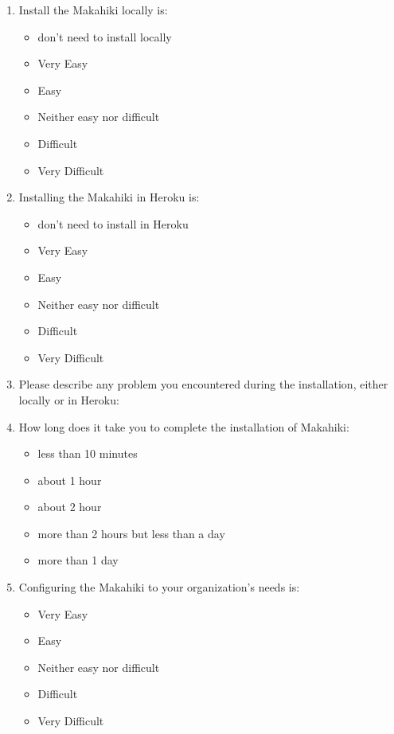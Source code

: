 \documentclass[11pt]{article}
\begin{document}
\begin{enumerate}

\item Install the Makahiki locally is: 
\begin{itemize}
\item don't need to install locally
\item Very Easy
\item Easy
\item Neither easy nor difficult
\item Difficult
\item Very Difficult
\end{itemize}

\item Installing the Makahiki in Heroku is: 
\begin{itemize}
\item don't need to install in Heroku
\item Very Easy
\item Easy
\item Neither easy nor difficult
\item Difficult
\item Very Difficult
\end{itemize}

\item Please describe any problem you encountered during the installation, either locally or in Heroku:

\item How long does it take you to complete the installation of Makahiki: 
\begin{itemize}
\item less than 10 minutes
\item about 1 hour
\item about 2 hour
\item more than 2 hours but less than a day
\item more than 1 day
\end{itemize}

\item Configuring the Makahiki to your organization's needs is: 
\begin{itemize}
\item Very Easy
\item Easy
\item Neither easy nor difficult
\item Difficult
\item Very Difficult
\end{itemize}


\end{enumerate}
\end{document}
